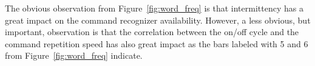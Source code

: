The obvious observation from Figure~\ref{fig:word_freq} is that intermittency has a great impact on the command recognizer availability. However, a less obvious, but important, observation is that the correlation between the on/off cycle and the command repetition speed has also great impact as the bars labeled with 5 and 6 from Figure~\ref{fig:word_freq} indicate. 





